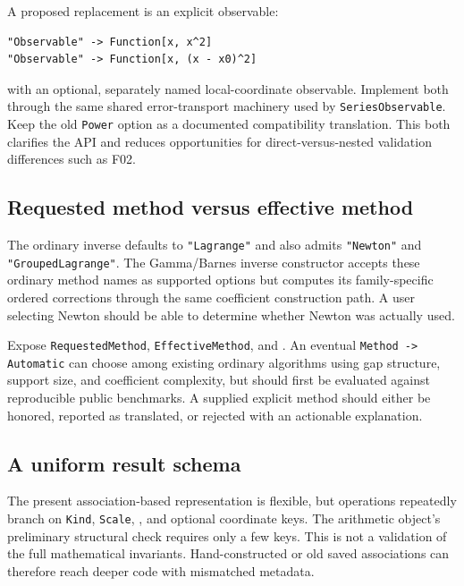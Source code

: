 A proposed replacement is an explicit observable:
\begin{lstlisting}
"Observable" -> Function[x, x^2]
"Observable" -> Function[x, (x - x0)^2]
\end{lstlisting}
with an optional, separately named local-coordinate observable. Implement both through the same shared error-transport machinery used by \texttt{SeriesObservable}. Keep the old \texttt{Power} option as a documented compatibility translation. This both clarifies the API and reduces opportunities for direct-versus-nested validation differences such as F02.

\subsection{Requested method versus effective method}

The ordinary inverse defaults to \texttt{"Lagrange"} and also admits \texttt{"Newton"} and \texttt{"GroupedLagrange"}. The Gamma/Barnes inverse constructor accepts these ordinary method names as supported options but computes its family-specific ordered corrections through the same coefficient construction path. A user selecting Newton should be able to determine whether Newton was actually used.\cite{core,gammainverse}

Expose \texttt{RequestedMethod}, \texttt{EffectiveMethod}, and . An eventual \texttt{Method -> Automatic} can choose among existing ordinary algorithms using gap structure, support size, and coefficient complexity, but should first be evaluated against reproducible public benchmarks. A supplied explicit method should either be honored, reported as translated, or rejected with an actionable explanation.

\subsection{A uniform result schema}

The present association-based representation is flexible, but operations repeatedly branch on \texttt{Kind}, \texttt{Scale}, , and optional coordinate keys. The arithmetic object's preliminary structural check requires only a few keys. This is not a validation of the full mathematical invariants. Hand-constructed or old saved associations can therefore reach deeper code with mismatched metadata.\cite{arithmetic,operations}

